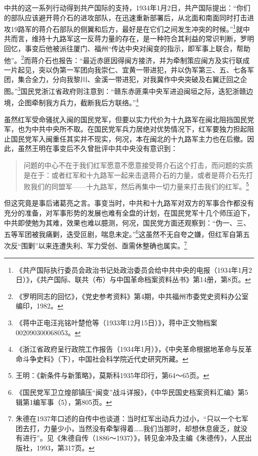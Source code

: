 中共的这一系列行动得到共产国际的支持，1934年1月2日，共产国际提出：“你们的部队应该避开蒋介石的进攻部队，在迅速重新部署后，从北面和南面同时打击进攻19路军的蒋介石部队的侧翼和后方，最好是在它们之间发生冲突的时候。”\footnote{《共产国际执行委员会政治书记处政治委员会给中共中央的电报（1934年1月2日）》，《共产国际、联共（布）与中国革命档案资料丛书》第14册，第8页。}就中共而言，维持十九路军这一反蒋力量的存在，是一种符合其利益的常识判断，罗明回忆，事变后他被派往厦门、福州“传达中央对闽变的指示，即军事上联合，帮助他”。\footnote{《罗明同志的回忆》，《党史参考资料》第4期，中共福州市委党史资料办公室编印，1982。}而蒋介石也报告：“最近赤匪因得闽方接济，并为牵制策应闽方及实行联成一片起见，突以伪第一军团向我崇仁、宜黄一带进犯，并以伪军第三、五、七各军团，集合全力，分向我黎川、金溪一带进犯，对我冀作中央突破及右翼迂回之企图。”\footnote{《蒋中正电汪兆铭叶楚伧等（1933年12月15日）》，蒋中正文物档案002090300068053。}国民党浙江省政府则注意到：“赣东赤匪乘中央军进迫闽垣之际，迭犯浙赣边境，企图牵制我方兵力，截断我后方联络。”\footnote{《浙江省政府呈行政院工作报告（1934年1月）》，《中央革命根据地革命与反革命斗争史料》（下），中国社会科学院近代史研究所藏。}


虽然红军受命骚扰入闽的国民党军，但要以实力代价为十九路军在闽北阻挡国民党军，也为中共中央所不取。在国民党军兵力居绝对优势情况下，红军要独力担起阻止国民党军入闽重任其实并不现实，何况，本在闽北的十九路军主力也在后撤。因此，虽然王明在事变后不久曾批评中共中央没有意识到：

\begin{quote}

问题的中心不在于我们红军愿意不愿意接受蒋介石这个打击，而问题的实质是在于：或者红军和十九路军一起来击退蒋介石的力量，或者是蒋介石先打败我们的同盟军——十九路军，然后再集中一切力量来打击我们的红军。\footnote{王明：《新条件与新策略》，莫斯科1935年印行，第64～65页。}
\end{quote}


但这究竟是事后诸葛亮之言。事变当时，中共和十九路军对双方的军事合作都没有充分的准备，对军事形势的发展也难有全盘的计划，在国民党军十几个师压迫下，中共即使勉为其难，效果也难以臆测，何况，国民党方面还观察到：“伪一、三、五等军团被我痛剿，迭受叵剧，喘息未定。”\footnote{《国民党军卫立煌部镇压“闽变”战斗详报》，《中华民国史档案资料汇编》第5辑第1编军事（5），第805页。}这虽然不无自夸之嫌，但红军自第五次反“围剿”以来连遭失利、军力受创、亟需休整确也属实。\footnote{朱德在1937年口述的自传中也谈道：当时红军出动兵力过小，“只以一个七军团去打，力量少小，当然没有牵掣得着……我们当那时，却想休息疲乏，就没有进行”。见《朱德自传（1886～1937）》，转见金冲及主编《朱德传》，人民出版社，1993，第317页。}


